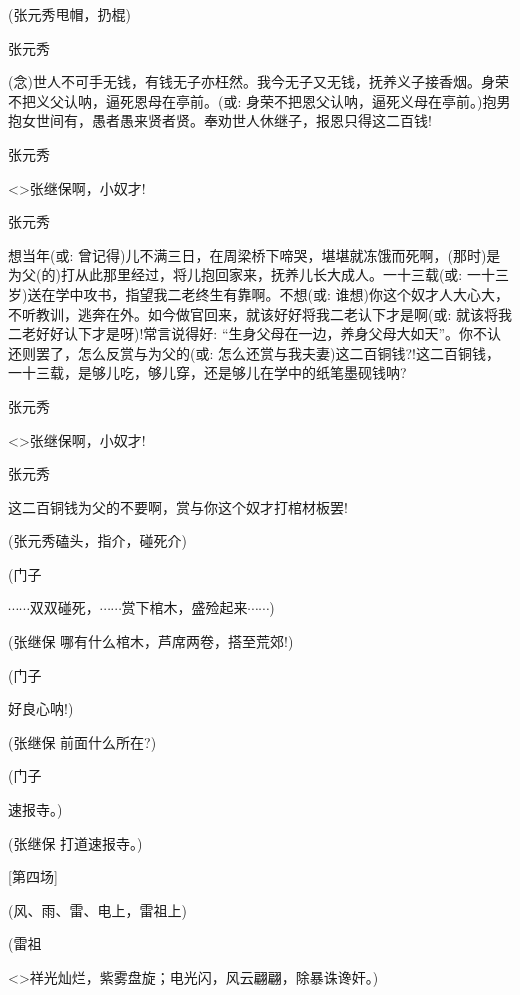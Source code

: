 {(张元秀甩帽，扔棍)}

{张元秀

({\akai 念})世人不可手无钱，有钱无子亦枉然。我今无子又无钱，抚养义子接香烟。身荣不把义父认呐，逼死恩母在亭前。({\akai 或}: 身荣不把恩父认呐，逼死义母在亭前。)抱男抱女世间有，愚者愚来贤者贤。奉劝世人休继子，报恩只得这二百钱!}

{张元秀}

\textless{}\!\textgreater{}{张继保啊，小奴才!}

{张元秀

想当年({\akai 或}: 曾记得)儿不满三日，在周梁桥下啼哭，堪堪就冻饿而死啊，(那时)是为父(的)打从此那里经过，将儿抱回家来，抚养儿长大成人。一十三载({\akai 或}: 一十三岁)送在学中攻书，指望我二老终生有靠啊。不想({\akai 或}: 谁想)你这个奴才人大心大，不听教训，逃奔在外。如今做官回来，就该好好将我二老认下才是啊({\akai 或}: 就该将我二老好好认下才是呀)!常言说得好: ``生身父母在一边，养身父母大如天''。你不认还则罢了，怎么反赏与为父的({\akai 或}: 怎么还赏与我夫妻)这二百铜钱?!这二百铜钱，一十三载，是够儿吃，够儿穿，还是够儿在学中的纸笔墨砚钱呐?}

{张元秀}

\textless{}\!\textgreater{}{张继保啊，小奴才!}

{张元秀\hspace{20pt}~

这二百铜钱为父的不要啊，赏与你这个奴才打棺材板罢!}

{(张元秀磕头，指介，碰死介)}

(门子

$\cdots{}\cdots{}$双双碰死，$\cdots{}\cdots{}$赏下棺木，盛殓起来$\cdots{}\cdots{}$)

{(张继保 哪有什么棺木，芦席两卷，搭至荒郊!)}

{(门子\hspace{30pt}~

好良心呐!)}

{(张继保 前面什么所在?)}

{(门子\hspace{30pt}~

速报寺。)}

{(张继保 打道速报寺。)}

{{[}第四场{]}}

{(风、雨、雷、电上，雷祖上)}

{(雷祖}

\textless{}\!\textgreater{}{祥光灿烂，紫雾盘旋；电光闪，风云翩翩，除暴诛谗奸。)}

